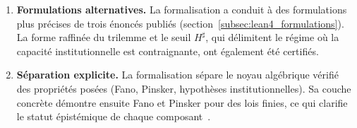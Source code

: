 \begin{sloppypar}
\begin{enumerate}
\item \textbf{Formulations alternatives.} La formalisation a conduit \`a des
formulations plus pr\'ecises de trois \'enonc\'es publi\'es
(section~\ref{subsec:lean4_formulations}). La forme raffin\'ee du trilemme et le seuil $H^\sharp$, qui
d\'elimitent le r\'egime o\`u la capacit\'e institutionnelle est contraignante, ont
\'egalement \'et\'e certifi\'es.

\item \textbf{S\'eparation explicite.} La formalisation s\'epare le noyau alg\'ebrique
v\'erifi\'e des propri\'et\'es pos\'ees (Fano, Pinsker, hypoth\`eses institutionnelles).
Sa couche concr\`ete d\'emontre ensuite Fano et Pinsker pour des lois finies, ce qui
clarifie le statut \'epist\'emique de chaque composant~\cite{Zellagui2018}.
\end{enumerate}
\end{sloppypar}


